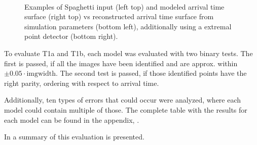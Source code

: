 \begin{figure}
  \centering
   \\
  \caption{Examples of Spaghetti input (left top) and modeled arrival time surface (right top) vs reconstructed arrival time surface from simulation parameters (bottom left), additionally using a extremal point detector (bottom right).
  \label{fig:output_compare}}
\end{figure}

To evaluate T1a and T1b, each model was evaluated with two binary tests.
The first is passed, if all the images have been identified and are approx. within $\pm0.05\cdot\text{imgwidth}$.
The second test is passed, if those identified points have the right parity, ordering with respect to arrival time.

Additionally, ten types of errors that could occur were analyzed, where each model could contain multiple of those.
The complete table with the results for each model can be found in the appendix, .

In  a summary of this evaluation is presented.


